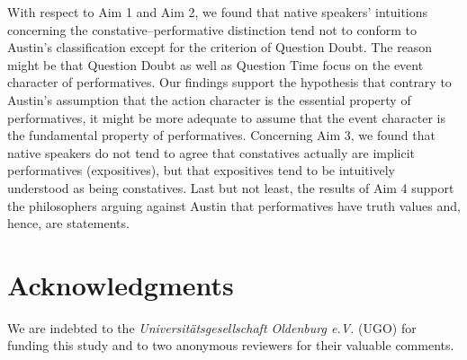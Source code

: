 \documentclass[egregdoesnotlikesansseriftitles,12pt]{scrartcl}
\begin{document}
With respect to Aim 1 and Aim 2, we found that native speakers' intuitions concerning the constative--performative distinction tend not to conform to Austin's classification except for the criterion of Question Doubt. The reason might be that Question Doubt as well as Question Time focus on the event character of performatives. Our findings support the hypothesis that contrary to Austin's assumption that the action character is the essential property of performatives, it might be more adequate to assume that the event character is the fundamental property of performatives. Concerning Aim 3, we found that native speakers do not tend to agree that constatives actually are implicit performatives (expositives), but that expositives tend to be intuitively understood as being constatives. Last but not least, the results of Aim 4 support the philosophers arguing against Austin that performatives have truth values and, hence, are statements.


\section*{Acknowledgments}\label{sec:acknowledgments}
We are indebted to the \textit{Universitätsgesellschaft Oldenburg e.V.} (UGO) for funding this study and to two anonymous reviewers for their valuable comments.


\clearpage
\end{document}
